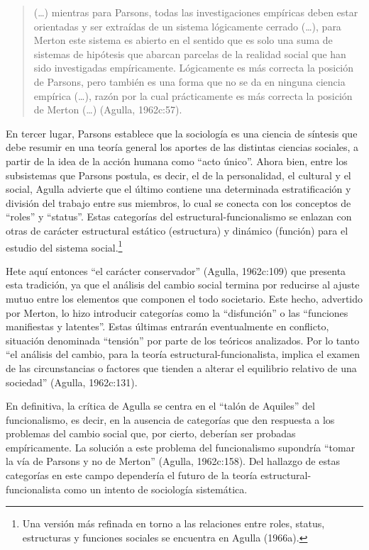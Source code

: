\begin{quote}
(\dots) mientras para Parsons, todas las investigaciones empíricas deben estar orientadas y ser extraídas de un sistema lógicamente cerrado (\dots), para Merton este sistema es abierto en el sentido que es solo una suma de sistemas de hipótesis que abarcan parcelas de la realidad social que han sido investigadas empíricamente. Lógicamente es más correcta la posición de Parsons, pero también es una forma que no se da en ninguna ciencia empírica (\dots), razón por la cual prácticamente es más correcta la posición de Merton (\dots) (Agulla, 1962c:57).
\end{quote}

En tercer lugar, Parsons establece que la sociología es una ciencia de síntesis que debe resumir en una teoría general los aportes de las distintas ciencias sociales, a partir de la idea de la acción humana como ``acto único''. Ahora bien, entre los subsistemas que Parsons postula, es decir, el de la personalidad, el cultural y el social, Agulla advierte que el último contiene una determinada estratificación y división del trabajo entre sus miembros, lo cual se conecta con los conceptos de ``roles'' y ``status''. Estas categorías del estructural-funcionalismo se enlazan con otras de carácter estructural estático (estructura) y dinámico (función) para el estudio del sistema social.\footnote{Una versión más refinada en torno a las relaciones entre roles, status, estructuras y funciones sociales se encuentra en Agulla (1966a).}

Hete aquí entonces ``el carácter conservador'' (Agulla, 1962c:109) que presenta esta tradición, ya que el análisis del cambio social termina por reducirse al ajuste mutuo entre los elementos que componen el todo societario. Este hecho, advertido por Merton, lo hizo introducir categorías como la ``disfunción'' o las ``funciones manifiestas y latentes''. Estas últimas entrarán eventualmente en conflicto, situación denominada ``tensión'' por parte de los teóricos analizados. Por lo tanto ``el análisis del cambio, para la teoría estructural-funcionalista, implica el examen de las circunstancias o factores que tienden a alterar el equilibrio relativo de una sociedad'' (Agulla, 1962c:131).

En definitiva, la crítica de Agulla se centra en el ``talón de Aquiles'' del funcionalismo, es decir, en la ausencia de categorías que den respuesta a los problemas del cambio social que, por cierto, deberían ser probadas empíricamente. La solución a este problema del funcionalismo supondría ``tomar la vía de Parsons y no de Merton'' (Agulla, 1962c:158). Del hallazgo de estas categorías en este campo dependería el futuro de la teoría estructural-funcionalista como un intento de sociología sistemática.


